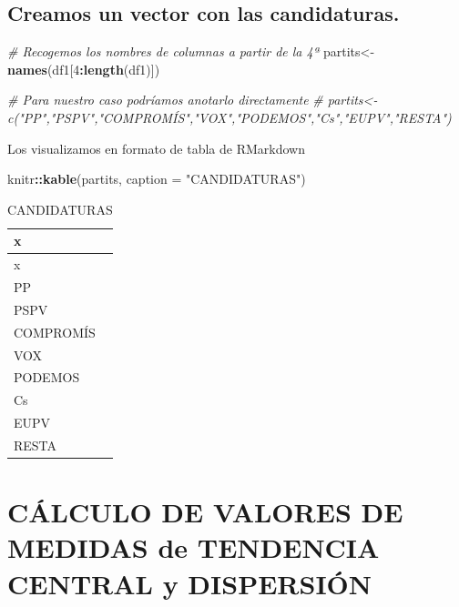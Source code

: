 \documentclass[
]{article}
\newenvironment{Shaded}{\begin{snugshade}}{\end{snugshade}}
\newcommand{\AttributeTok}[1]{\textcolor[rgb]{0.13,0.29,0.53}{#1}}
\newcommand{\CommentTok}[1]{\textcolor[rgb]{0.56,0.35,0.01}{\textit{#1}}}
\newcommand{\DecValTok}[1]{\textcolor[rgb]{0.00,0.00,0.81}{#1}}
\newcommand{\FunctionTok}[1]{\textcolor[rgb]{0.13,0.29,0.53}{\textbf{#1}}}
\newcommand{\NormalTok}[1]{#1}
\newcommand{\OtherTok}[1]{\textcolor[rgb]{0.56,0.35,0.01}{#1}}
\newcommand{\SpecialCharTok}[1]{\textcolor[rgb]{0.81,0.36,0.00}{\textbf{#1}}}
\newcommand{\StringTok}[1]{\textcolor[rgb]{0.31,0.60,0.02}{#1}}
\begin{document}
\hypertarget{creamos-un-vector-con-las-candidaturas.}{%
\subsection{Creamos un vector con las
candidaturas.}\label{creamos-un-vector-con-las-candidaturas.}}

\begin{Shaded}
\begin{Highlighting}[]
\CommentTok{\# Recogemos los nombres de columnas a partir de la 4ª}
\NormalTok{partits}\OtherTok{\textless{}{-}}\FunctionTok{names}\NormalTok{(df1[}\DecValTok{4}\SpecialCharTok{:}\FunctionTok{length}\NormalTok{(df1)])}

\CommentTok{\# Para nuestro caso podríamos anotarlo directamente}
\CommentTok{\# partits\textless{}{-}c("PP","PSPV","COMPROMÍS","VOX","PODEMOS","Cs","EUPV","RESTA")}
\end{Highlighting}
\end{Shaded}

Los visualizamos en formato de tabla de RMarkdown

\begin{Shaded}
\begin{Highlighting}[]
\NormalTok{knitr}\SpecialCharTok{::}\FunctionTok{kable}\NormalTok{(partits, }\AttributeTok{caption =} \StringTok{"CANDIDATURAS"}\NormalTok{)}
\end{Highlighting}
\end{Shaded}

\begin{longtable}[]{@{}l@{}}
\caption{CANDIDATURAS}\tabularnewline
\toprule\noalign{}
x \\
\midrule\noalign{}
\endfirsthead
\toprule\noalign{}
x \\
\midrule\noalign{}
\endhead
\bottomrule\noalign{}
\endlastfoot
PP \\
PSPV \\
COMPROMÍS \\
VOX \\
PODEMOS \\
Cs \\
EUPV \\
RESTA \\
\end{longtable}

\hypertarget{cuxe1lculo-de-valores-de-medidas-de-tendencia-central-y-dispersiuxf3n}{%
\section{CÁLCULO DE VALORES DE MEDIDAS de TENDENCIA CENTRAL y
DISPERSIÓN}\label{cuxe1lculo-de-valores-de-medidas-de-tendencia-central-y-dispersiuxf3n}}
\end{document}
